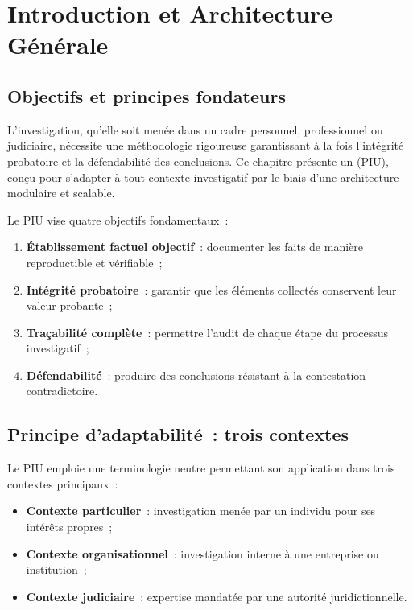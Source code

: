 \bigskip

\section{Introduction et Architecture Générale}
\label{sec:piu-intro}

\subsection{Objectifs et principes fondateurs}

L'investigation, qu'elle soit menée dans un cadre personnel, professionnel ou
judiciaire, nécessite une méthodologie rigoureuse garantissant à la fois
l'intégrité probatoire et la défendabilité des conclusions. Ce chapitre
présente un  (PIU), conçu pour
s'adapter à tout contexte investigatif par le biais d'une architecture
modulaire et scalable.

Le PIU vise quatre objectifs fondamentaux~:
\begin{enumerate}
    \item \textbf{Établissement factuel objectif}~: documenter les faits de
          manière reproductible et vérifiable~;
    \item \textbf{Intégrité probatoire}~: garantir que les éléments collectés
          conservent leur valeur probante~;
    \item \textbf{Traçabilité complète}~: permettre l'audit de chaque étape
          du processus investigatif~;
    \item \textbf{Défendabilité}~: produire des conclusions résistant à la
          contestation contradictoire.
\end{enumerate}

\subsection{Principe d'adaptabilité~: trois contextes}

Le PIU emploie une terminologie neutre permettant son application dans trois
contextes principaux~:
\begin{itemize}
    \item \textbf{Contexte particulier}~: investigation menée par un individu
          pour ses intérêts propres~;
    \item \textbf{Contexte organisationnel}~: investigation interne à une
          entreprise ou institution~;
    \item \textbf{Contexte judiciaire}~: expertise mandatée par une autorité
          juridictionnelle.
\end{itemize}

